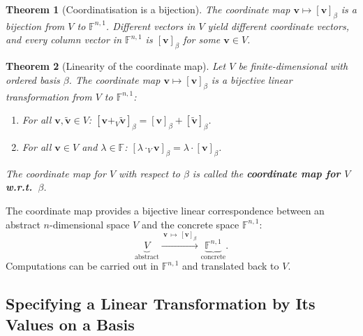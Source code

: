 \documentclass[11pt, a4paper, notitlepage]{report}
\newtheorem{theorem}{Theorem}[section]
\theoremstyle{definition}
\theoremstyle{remark}
\begin{document}
\begin{theorem}[Coordinatisation is a bijection]\label{thm:coord-bijection}
The coordinate map $\mathbf{v} \mapsto [\mathbf{v}]_\beta$ is a bijection from $V$ to $\mathbb{F}^{n,1}$.
Different vectors in $V$ yield different coordinate vectors, and every column vector in $\mathbb{F}^{n,1}$
is $[\mathbf{v}]_\beta$ for some $\mathbf{v} \in V$.
\end{theorem}

\begin{theorem}[Linearity of the coordinate map]\label{thm:coord-linear}
Let $V$ be finite-dimensional with ordered basis $\beta$. The coordinate map $\mathbf{v} \mapsto [\mathbf{v}]_\beta$ is a bijective linear transformation from $V$ to $\mathbb{F}^{n,1}$:
\begin{enumerate}
  \item For all $\mathbf{v}, \tilde{\mathbf{v}} \in V$: $[\mathbf{v} +_V \tilde{\mathbf{v}}]_\beta = [\mathbf{v}]_\beta + [\tilde{\mathbf{v}}]_\beta$.
  \item For all $\mathbf{v} \in V$ and $\lambda \in \mathbb{F}$: $[\lambda \cdot_V \mathbf{v}]_\beta = \lambda \cdot [\mathbf{v}]_\beta$.
\end{enumerate}
The coordinate map for $V$ with respect to $\beta$ is called the \textbf{coordinate map for $V$ w.r.t.\ $\beta$}.
\end{theorem}

\begin{keyresult}[title={Key Result: Abstract $\leftrightarrow$ Concrete}]
The coordinate map provides a bijective linear correspondence between an abstract
$n$-dimensional space $V$ and the concrete space $\mathbb{F}^{n,1}$:
\[
  \underbrace{V}_{\text{abstract}} \xrightarrow{\ \mathbf{v}\,\mapsto\,[\mathbf{v}]_\beta\ } \underbrace{\mathbb{F}^{n,1}}_{\text{concrete}}.
\]
Computations can be carried out in $\mathbb{F}^{n,1}$ and translated back to $V$.
\end{keyresult}

\subsection{Specifying a Linear Transformation by Its Values on a Basis}
\end{document}
